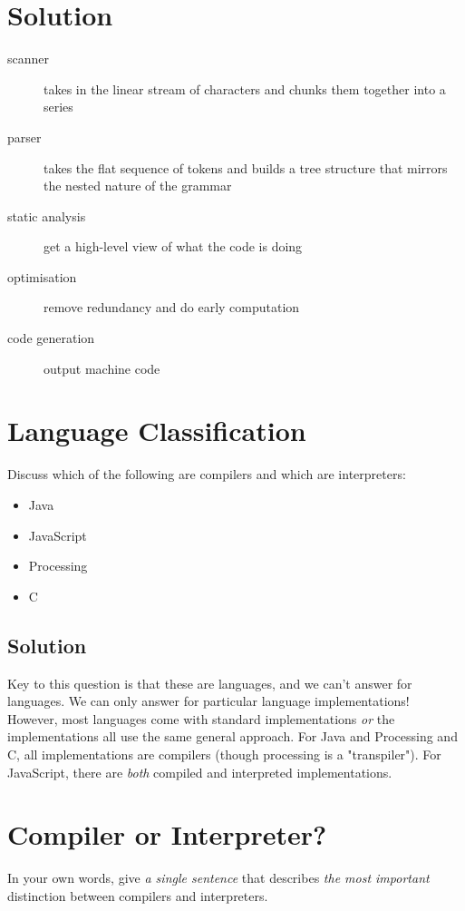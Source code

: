 \documentclass[twoside=false, DIV=14]{scrartcl}
\begin{document}
\section*{Solution}
\begin{description}
  \item[scanner] takes in the linear stream of characters and chunks them together into a series
  \item[parser] takes the flat sequence of tokens and builds a tree structure that mirrors the nested nature of the grammar
  \item[static analysis] get a high-level view of what the code is doing
  \item[optimisation] remove redundancy and do early computation
  \item[code generation] output machine code
\end{description}
\section*{Language Classification}
  Discuss which of the following are compilers and which are interpreters:
  \begin{itemize}
    \renewcommand{\labelitemi}{$\square$}
    \item Java
    \item JavaScript
    \item Processing
    \item C
  \end{itemize}
  
\subsection*{Solution}
Key to this question is that these are languages, and we can't answer for languages. We can only answer for particular language implementations! However, most languages come with standard implementations \emph{or} the implementations all use the same general approach. For Java and Processing and C, all implementations are compilers (though processing is a "transpiler"). For JavaScript, there are \emph{both} compiled and interpreted implementations.

\section*{Compiler or Interpreter?}
In your own words, give \emph{a single sentence} that describes \emph{the most important} distinction between compilers and interpreters.
\end{document}
